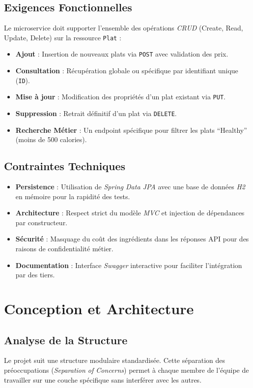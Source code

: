 \documentclass[12pt,a4paper,french]{article}
\begin{document}
\subsection{Exigences Fonctionnelles}
Le microservice doit supporter l'ensemble des opérations \textit{CRUD} (Create, Read, Update, Delete)
sur la ressource \texttt{Plat} :
\begin{itemize}
    \item \textbf{Ajout} : Insertion de nouveaux plats via \texttt{POST} avec validation des prix.
    \item \textbf{Consultation} : Récupération globale ou spécifique par identifiant unique (\texttt{ID}).
    \item \textbf{Mise à jour} : Modification des propriétés d'un plat existant via \texttt{PUT}.
    \item \textbf{Suppression} : Retrait définitif d'un plat via \texttt{DELETE}.
    \item \textbf{Recherche Métier} : Un endpoint spécifique pour filtrer les plats ``Healthy''
          (moins de 500 calories).
\end{itemize}

\subsection{Contraintes Techniques}
\begin{itemize}
    \item \textbf{Persistence} : Utilisation de \textit{Spring Data JPA} avec une base de données \textit{H2} en
          mémoire pour la rapidité des tests.
    \item \textbf{Architecture} : Respect strict du modèle \textit{MVC} et injection de dépendances par constructeur.
    \item \textbf{Sécurité} : Masquage du coût des ingrédients dans les réponses API pour des raisons de
          confidentialité métier.
    \item \textbf{Documentation} : Interface \textit{Swagger} interactive pour faciliter l'intégration par des tiers.
\end{itemize}

\section{Conception et Architecture}
\subsection{Analyse de la Structure}
Le projet suit une structure modulaire standardisée. Cette séparation des préoccupations (\textit{Separation of Concerns})
permet à chaque membre de l'équipe de travailler sur une couche spécifique sans interférer avec les autres.
\end{document}
